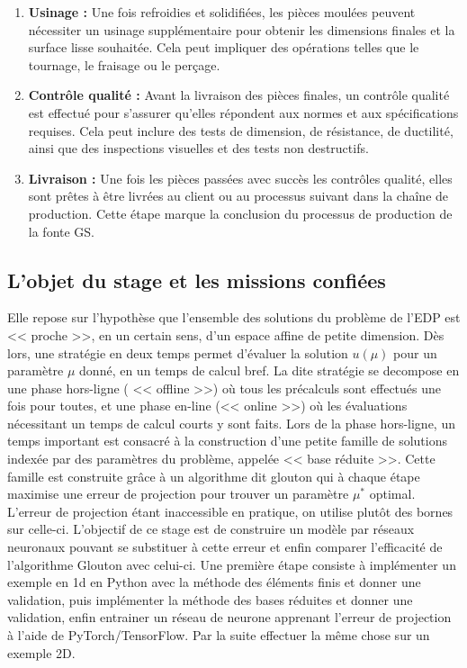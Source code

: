 \documentclass[12pt]{article}
\begin{document}
\begin{enumerate}
    \item \textbf{Usinage :} Une fois refroidies et solidifiées, les pièces moulées 
    peuvent nécessiter un usinage supplémentaire pour obtenir les dimensions finales 
    et la surface lisse souhaitée. Cela peut impliquer des opérations telles que le 
    tournage, le fraisage ou le perçage.
    
    \item \textbf{Contrôle qualité :} Avant la livraison des pièces finales, un 
    contrôle qualité est effectué pour s'assurer qu'elles répondent aux normes et 
    aux spécifications requises. Cela peut inclure des tests de dimension, de 
    résistance, de ductilité, ainsi que des inspections visuelles et des tests non 
    destructifs.
    
    \item \textbf{Livraison :} Une fois les pièces passées avec succès les contrôles 
    qualité, elles sont prêtes à être livrées au client ou au processus suivant dans 
    la chaîne de production. Cette étape marque la conclusion du processus de 
    production de la fonte GS.
\end{enumerate}


\subsection{L'objet du stage et les missions confiées }




Elle repose sur l'hypothèse que l'ensemble des solutions du problème de l'EDP est << proche >>, en un certain sens, d'un espace affine de petite dimension.
Dès lors, une stratégie en deux temps permet d'évaluer la solution $u(\mu)$ pour un paramètre $\mu$ donné, en un temps de calcul bref.
La dite stratégie se decompose en une phase hors-ligne ( << offline >>) où tous les précalculs sont effectués une fois pour toutes, et une phase en-line (<< online >>) où les évaluations nécessitant un temps de calcul courts y sont faits.
Lors de la phase hors-ligne, un temps important est consacré à la construction d'une petite famille de solutions indexée par des paramètres du problème, appelée << base réduite >>.
Cette famille est construite grâce à un algorithme dit glouton qui à chaque étape maximise une erreur de projection pour trouver un paramètre $\mu^*$ optimal.
L'erreur de projection étant inaccessible en pratique, on utilise plutôt des bornes sur celle-ci.
L'objectif de ce stage est de construire un modèle par réseaux neuronaux pouvant se substituer à cette erreur et enfin comparer l'efficacité de l'algorithme Glouton avec celui-ci. Une première étape consiste à implémenter un exemple en 1d en Python avec la méthode des éléments finis et donner une validation, puis implémenter la méthode des bases réduites et donner une validation, enfin entrainer un réseau de neurone apprenant l'erreur de projection à l'aide de PyTorch/TensorFlow. Par la suite effectuer la même chose sur un exemple 2D.
\end{document}
